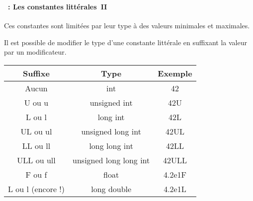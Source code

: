 \begin{frame}[containsverbatim]
  \frametitle{\secname}
  \framesubtitle{\subsecname~: Les constantes littérales~II}
  
  Ces constantes sont limitées par leur type à des valeurs minimales et maximales.
  \par
  Il est possible de modifier le type d'une constante littérale en suffixant la valeur par un modificateur.
  \begin{center}
    \begin{tabular}{|c|c|c|}
      \hline
      Suffixe & Type & Exemple\\
      \hline
      Aucun & int & 42 \\
      \hline
      U ou u & unsigned int & 42U \\
      \hline
      L ou l & long int & 42L \\
      \hline
      UL ou ul & unsigned long int & 42UL \\
      \hline
      LL ou ll & long long int & 42LL \\
      \hline
      ULL ou ull & unsigned long long int & 42ULL \\
      \hline
      F ou f & float & 4.2e1F \\
      \hline
      L ou l (encore !) & long double & 4.2e1L \\
      \hline
    \end{tabular}
  \end{center}
\end{frame}

